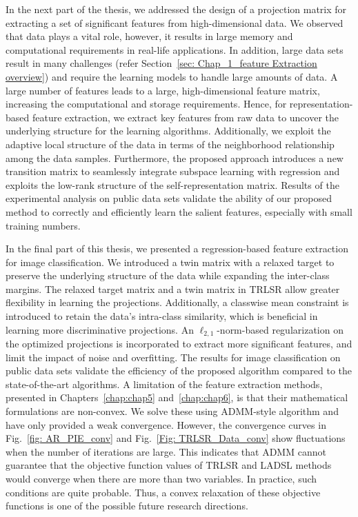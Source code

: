 In the next part of the thesis, we addressed the design of a projection matrix for extracting a set of significant features from high-dimensional data. We observed that data plays a vital role, however, it results in large memory and computational requirements in real-life applications. In addition, large data sets result in many challenges (refer Section~\ref{sec: Chap_1_feature Extraction overview}) and require the learning models to handle large amounts of data. A large number of features leads to a large, high-dimensional feature matrix, increasing the computational and storage requirements. Hence, for representation-based feature extraction, we extract key features from raw data to uncover the underlying structure for the learning algorithms. Additionally, we exploit the adaptive local structure of the data in terms of the neighborhood relationship among the data samples. Furthermore, the proposed approach introduces a new transition matrix to seamlessly integrate subspace learning with regression and exploits the low-rank structure of the self-representation matrix. Results of the experimental analysis on public data sets validate the ability of our proposed method to correctly and efficiently learn the salient features, especially with small training numbers.

In the final part of this thesis, we presented a regression-based feature extraction for image classification. We introduced a twin matrix with a relaxed target to preserve the underlying structure of the data while expanding the inter-class margins. The relaxed target matrix and a twin matrix in TRLSR allow greater flexibility in learning the projections. Additionally, a classwise mean constraint is introduced to retain the data's intra-class similarity, which is beneficial in learning more discriminative projections. An $\ell_{2,1}$-norm-based regularization on the optimized projections is incorporated to extract more significant features, and limit the impact of noise and overfitting. The results for image classification on public data sets validate the efficiency of the proposed algorithm compared to the state-of-the-art algorithms. A limitation of the feature extraction methods, presented in Chapters~\ref{chap:chap5} and~\ref{chap:chap6}, is that their mathematical formulations are non-convex. We solve these using ADMM-style algorithm and have only provided a weak convergence. However, the convergence curves in Fig.~\ref{fig: AR_PIE_conv} and Fig.~\ref{Fig: TRLSR_Data_conv} show fluctuations when the number of iterations are large. This indicates that ADMM cannot guarantee that the objective function values of TRLSR and LADSL methods would converge when there are more than two variables. In practice, such conditions are quite probable. Thus, a convex relaxation of these objective functions is one of the possible future research directions.
%
